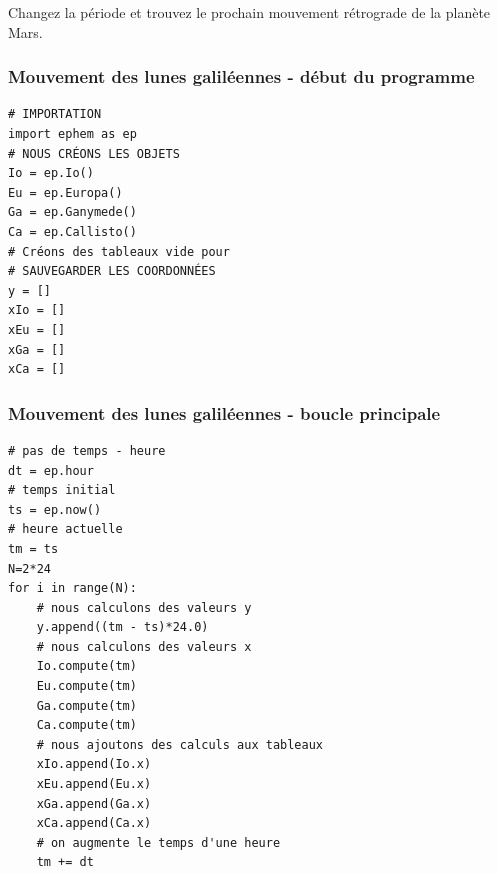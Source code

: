 \documentclass{beamer}
\newenvironment{doconceexercise}{}{}
\newcounter{doconceexercisecounter}
\newcounter{doconce:movie:counter}
\begin{document}
\begin{frame}

\begin{doconceexercise}



Changez la période et trouvez le prochain mouvement rétrograde de la planète Mars.

\end{doconceexercise}
\end{frame}

\begin{frame}
\frametitle{Mouvement des lunes galiléennes - début du programme}

\begin{verbatim}
# IMPORTATION
import ephem as ep
# NOUS CRÉONS LES OBJETS
Io = ep.Io()
Eu = ep.Europa()
Ga = ep.Ganymede()
Ca = ep.Callisto()
# Créons des tableaux vide pour
# SAUVEGARDER LES COORDONNÉES
y = []
xIo = []
xEu = []
xGa = []
xCa = []
\end{verbatim}
\end{frame}

\begin{frame}
\frametitle{Mouvement des lunes galiléennes - boucle principale}

\begin{verbatim}
# pas de temps - heure
dt = ep.hour
# temps initial
ts = ep.now()
# heure actuelle
tm = ts
N=2*24
for i in range(N):
    # nous calculons des valeurs y
    y.append((tm - ts)*24.0)
    # nous calculons des valeurs x
    Io.compute(tm)
    Eu.compute(tm)
    Ga.compute(tm)
    Ca.compute(tm)
    # nous ajoutons des calculs aux tableaux
    xIo.append(Io.x)
    xEu.append(Eu.x)
    xGa.append(Ga.x)
    xCa.append(Ca.x)
    # on augmente le temps d'une heure
    tm += dt
\end{verbatim}
\end{frame}
\end{document}
